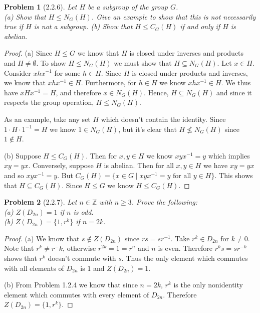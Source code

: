 \documentclass{article}
\newtheorem{problem}{Problem}
\begin{document}
\begin{problem}[2.2.6]
Let $H$ be a subgroup of the group $G$.\\
(a) Show that $H \leq N_G(H)$. Give an example to show that this is not necessarily true if $H$ is not a subgroup.
(b) Show that $H \leq C_G(H)$ if and only if $H$ is abelian.
\end{problem}
\begin{proof}
(a) Since $H \leq G$ we know that $H$ is closed under inverses and products and $H \neq \emptyset$. To show $H \leq N_G(H)$ we must show that $H \subseteq N_G(H)$. Let $x \in H$. Consider $xhx^{-1}$ for some $h \in H$. Since $H$ is closed under products and inverses, we know that $xhx^{-1} \in H$. Furthermore, for $h \in H$ we know $xhx^{-1} \in H$. We thus have $xHx^{-1} = H$, and therefore $x \in N_G(H)$. Hence, $H \subseteq N_G(H)$ and since it respects the group operation, $H \leq N_G(H)$.

As an example, take any set $H$ which doesn't contain the identity. Since $1 \cdot H \cdot 1^{-1} = H$ we know $1 \in N_G(H)$, but it's clear that $H \nleq N_G(H)$ since $1 \notin H$.

(b) Suppose $H \leq C_G(H)$. Then for $x,y \in H$ we know $xyx^{-1} = y$ which implies $xy = yx$. Conversely, suppose $H$ is abelian. Then for all $x,y \in H$ we have $xy = yx$ and so $xyx^{-1} = y$. But $C_G(H) = \{x \in G \mid xyx^{-1} = y \text{ for all } y \in H\}$. This shows that $H \subseteq C_G(H)$. Since $H \leq G$ we know $H \leq C_G(H)$.
\end{proof}

\begin{problem}[2.2.7]
\label{d2ncenter}
Let $n \in \mathbb{Z}$ with $n \geq 3$. Prove the following:\\
(a) $Z(D_{2n}) = 1$ if $n$ is odd.\\
(b) $Z(D_{2n}) = \{1, r^k\}$ if $n = 2k$.
\end{problem}
\begin{proof}
(a) We know that $s \notin Z(D_{2n})$ since $rs = sr^{-1}$. Take $r^k \in D_{2n}$ for $k \neq 0$. Note that $r^k \neq r^-k$, otherwise $r^{2k} = 1 = r^n$ and $n$ is even. Therefore $r^ks = sr^{-k}$ shows that $r^k$ doesn't commute with $s$. Thus the only element which commutes with all elements of $D_{2n}$ is $1$ and $Z(D_{2n}) = 1$.

(b) From Problem 1.2.4 we know that since $n = 2k$, $r^k$ is the only nonidentity element which commutes with every element of $D_{2n}$. Therefore $Z(D_{2n}) = \{1, r^k\}$.
\end{proof}
\end{document}
